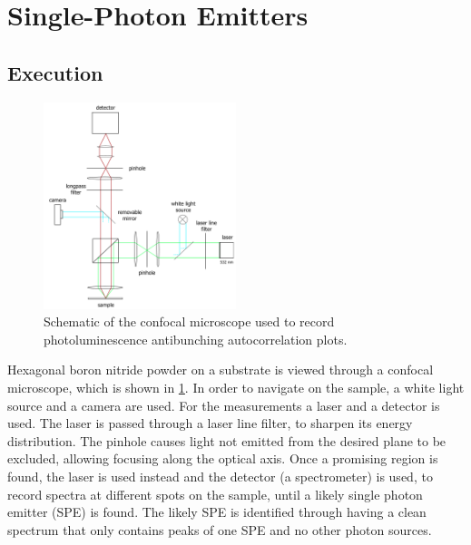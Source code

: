 \section{Single-Photon Emitters}
\label{sec:SPE}

\subsection{Execution}

\begin{figure}[H]
    \centering
    \includegraphics[width=0.5\textwidth]{img/setup2.png}
    \caption{Schematic of the confocal microscope used to record photoluminescence antibunching autocorrelation plots.}
    \label{fig_confocal}
\end{figure}

Hexagonal boron nitride powder on a substrate is viewed through a confocal microscope, which is shown in \cref{fig_confocal}.
In order to navigate on the sample, a white light source and a camera are used.
For the measurements a laser and a detector is used.
The laser is passed through a laser line filter, to sharpen its energy distribution.
The pinhole causes light not emitted from the desired plane to be excluded, allowing focusing along the optical axis.
Once a promising region is found, the laser is used instead and the detector (a spectrometer) is used, to record spectra at different spots on the sample, until a likely single photon emitter (SPE) is found.
The likely SPE is identified through having a clean spectrum that only contains peaks of one SPE and no other photon sources.

